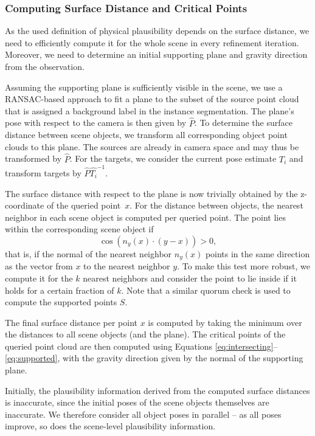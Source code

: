 \documentclass[10pt,twocolumn,letterpaper]{article}
\begin{document}
\subsubsection{Computing Surface Distance and Critical Points}
As the used definition of physical plausibility depends on the surface distance, we need to efficiently compute it for the whole scene in every refinement iteration. Moreover, we need to determine an initial supporting plane and gravity direction from the observation.

Assuming the supporting plane is sufficiently visible in the scene, we use a RANSAC-based approach to fit a plane to the subset of the source point cloud that is assigned a background label in the instance segmentation. The plane's pose with respect to the camera is then given by $\hat{P}$. To determine the surface distance between scene objects, we transform all corresponding object point clouds to this plane. The sources are already in camera space and may thus be transformed by $\hat{P}$. For the targets, we consider the current pose estimate $\hat{T_i}$ and transform targets by $\hat{P}\hat{T_i}^{-1}$.

The surface distance with respect to the plane is now trivially obtained by the z-coordinate of the queried point~$x$. For the distance between objects, the nearest neighbor in each scene object is computed per queried point. The point lies within the corresponding scene object if
\begin{equation}
    \cos (n_y(x) \cdot (y - x) ) > 0,
\end{equation}
that is, if the normal of the nearest neighbor $n_y(x)$ points in the same direction as the vector from $x$ to the nearest neighbor $y$. To make this test more robust, we compute it for the $k$ nearest neighbors and consider the point to lie inside if it holds for a certain fraction of $k$. Note that a similar quorum check is used to compute the supported points $S$. 

The final surface distance per point $x$ is computed by taking the minimum over the distances to all scene objects (and the plane). The critical points of the queried point cloud are then computed using Equations \eqref{eq:intersecting}--\eqref{eq:supported}, with the gravity direction given by the normal of the supporting plane. 

%
Initially, the plausibility information derived from the computed surface distances is inaccurate, since the initial poses of the scene objects themselves are inaccurate. We therefore consider all object poses in parallel -- as all poses improve, so does the scene-level plausibility information. 
\end{document}
